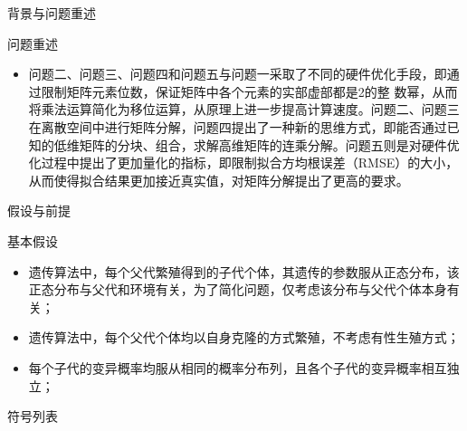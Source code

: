 \documentclass[11pt]{article}
\begin{document}
\begin{section}{背景与问题重述}
\begin{subsection}{问题重述}
\begin{itemize}
     \item 问题二、问题三、问题四和问题五与问题一采取了不同的硬件优化手段，即通过限制矩阵元素位数，保证矩阵中各个元素的实部虚部都是2的整 数幂，从而将乘法运算简化为移位运算，从原理上进一步提高计算速度。问题二、问题三 在离散空间中进行矩阵分解，问题四提出了一种新的思维方式，即能否通过已知的低维矩阵的分块、组合，求解高维矩阵的连乘分解。问题五则是对硬件优化过程中提出了更加量化的指标，即限制拟合方均根误差（RMSE）的大小，从而使得拟合结果更加接近真实值，对矩阵分解提出了更高的要求。
   \end{itemize}
 \end{subsection}
\end{section}
\begin{section}{假设与前提}
 \begin{subsection}{基本假设}
   \begin{itemize}
     \item[\textbullet] 遗传算法中，每个父代繁殖得到的子代个体，其遗传的参数服从正态分布，该正态分布与父代和环境有关，为了简化问题，仅考虑该分布与父代个体本身有关；
     \item[\textbullet] 遗传算法中，每个父代个体均以自身克隆的方式繁殖，不考虑有性生殖方式；
     \item[\textbullet] 每个子代的变异概率均服从相同的概率分布列，且各个子代的变异概率相互独立；
   \end{itemize}
 \end{subsection}
 \begin{subsection}{符号列表}


\end{subsection}
\end{section}
\end{document}
